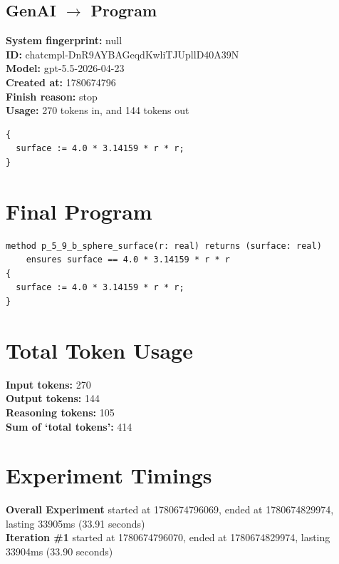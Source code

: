 \documentclass{article}
\begin{document}
\subsection*{GenAI $\rightarrow$ Program}
\textbf{System fingerprint: }null
\\\textbf{ID: }chatcmpl-DnR9AYBAGeqdKwliTJUpllD40A39N
\\\textbf{Model: }gpt-5.5-2026-04-23
\\\textbf{Created at: }1780674796
\\\textbf{Finish reason: }stop
\\\textbf{Usage: }270 tokens in, and 144 tokens out
\begin{lstlisting}
{
  surface := 4.0 * 3.14159 * r * r;
}
\end{lstlisting}
\section*{Final Program}
\begin{lstlisting}
method p_5_9_b_sphere_surface(r: real) returns (surface: real)
	ensures surface == 4.0 * 3.14159 * r * r
{
  surface := 4.0 * 3.14159 * r * r;
}
\end{lstlisting}
\section*{Total Token Usage}
\textbf{Input tokens: }270
\\\textbf{Output tokens: }144
\\\textbf{Reasoning tokens: }105
\\\textbf{Sum of `total tokens': }414
\section*{Experiment Timings}
\textbf{Overall Experiment} started at 1780674796069, ended at 1780674829974, lasting 33905ms (33.91 seconds)
\\\textbf{Iteration \#1} started at 1780674796070, ended at 1780674829974, lasting 33904ms (33.90 seconds)
\end{document}
